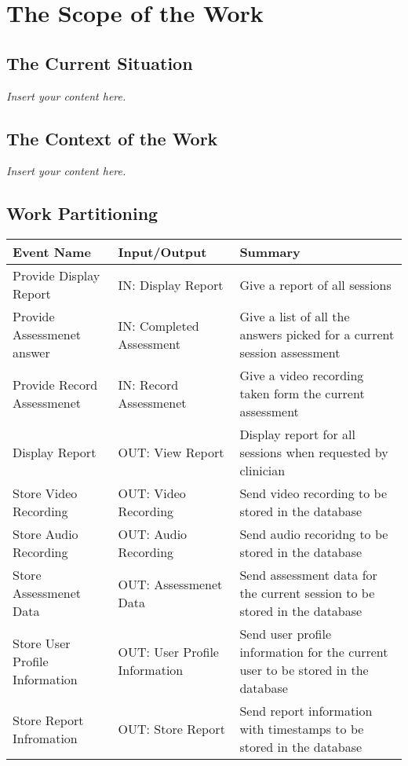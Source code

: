 \documentclass[12pt]{article}
\newcommand{\lips}{\textit{Insert your content here.}}
\begin{document}
\section{The Scope of the Work}
\subsection{The Current Situation}
\lips
\subsection{The Context of the Work}
\lips
\subsection{Work Partitioning}
\begin{table}[H]
  \centering
  \begin{tabularx}{1.2\textwidth} { 
     >{\raggedright\arraybackslash}X 
    | >{\raggedright\arraybackslash}X 
    | >{\raggedright\arraybackslash}X  }
  \toprule
  \textbf{Event Name} & \textbf{Input/Output} & \textbf{Summary} \\
  \midrule
  Provide Display Report & IN: Display Report & Give a report of all sessions\\ 
  \midrule
  Provide Assessmenet answer & IN: Completed Assessment & Give a list of all the answers picked for a current session assessment \\ 
  \midrule
  Provide Record Assessmenet & IN: Record Assessmenet & Give a video recording taken form the current assessment \\ 
  \midrule
  Display Report & OUT: View Report  & Display report for all sessions when requested by clinician   \\ 
  \midrule
  Store Video Recording & OUT: Video Recording  & Send video recording to be stored in the database \\
  \midrule
  Store Audio Recording & OUT: Audio Recording  & Send audio recoridng to be stored in the database \\
  \midrule
  Store Assessmenet Data & OUT: Assessmenet Data  & Send assessment data for the current session to be stored in the database \\
  \midrule
  Store User Profile Information& OUT: User Profile Information  & Send user profile information for the current user to be stored in the database \\
  \midrule
  Store Report Infromation & OUT: Store Report  & Send report information with timestamps to be stored in the database \\
\bottomrule
\end{tabularx}
\end{table}
\end{document}
